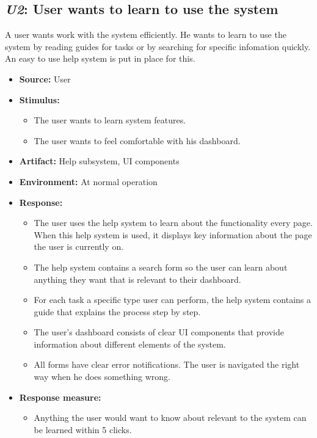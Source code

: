 \subsection{\emph{U2}: User wants to learn to use the system}
A user wants work with the system efficiently. He wants to learn to use the system
by reading guides for tasks or by searching for specific infomation quickly.
An easy to use help system is put in place for this.

\begin{itemize}
    \item \textbf{Source:} User
    \item \textbf{Stimulus:}
        \begin{itemize}
            \item The user wants to learn system features.
            \item The user wants to feel comfortable with his dashboard.
        \end{itemize}

    \item \textbf{Artifact:} Help subsystem, UI components
    \item \textbf{Environment:} At normal operation
    \item \textbf{Response:}
        \begin{itemize}
            \item The user uses the help system to learn about the functionality
                  every page. When this help system is used, it displays
                  key information about the page the user is currently
                  on.
            \item The help system contains a search form so the user can learn about
                  anything they want that is relevant to their dashboard.
            \item For each task a specific type user can perform, the help system
                  contains a guide that explains the process step by step.
            \item The user's dashboard consists of clear UI components that
                  provide information about different elements of the system.
            \item All forms have clear error notifications. The user is navigated the right way
                  when he does something wrong.
        \end{itemize}

    \item \textbf{Response measure:}
        \begin{itemize}
            \item Anything the user would want to know about relevant to the system
                  can be learned within 5 clicks.
        \end{itemize}
\end{itemize}
